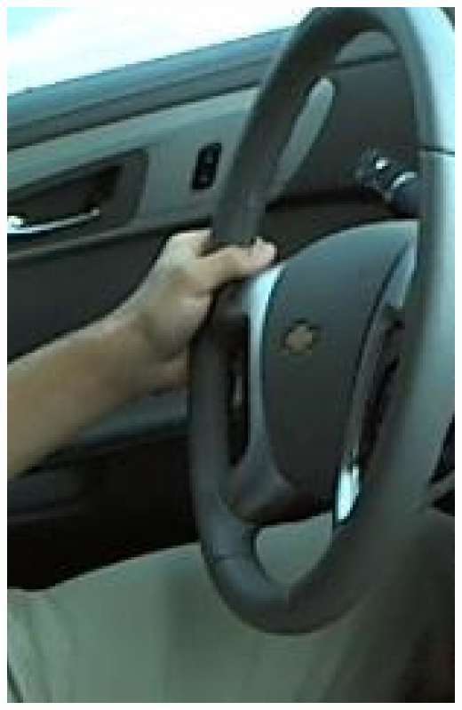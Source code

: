 \documentclass{beamer}
\begin{document}
\begin{frame}
\begin{columns}
\begin{column}{0.5\textwidth}
\begin{center}
					\includegraphics[height=0.5\textheight]{handpose_example_4_cut}\\			
				\end{center}
			\end{column}
		\end{columns}		
	\end{frame}
	
\end{document}
